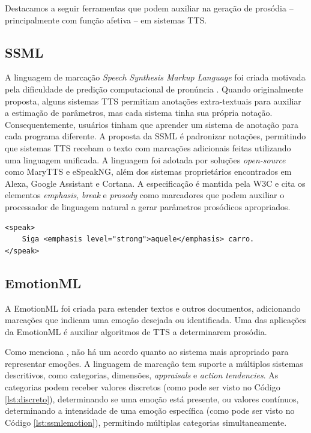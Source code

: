 Destacamos a seguir ferramentas que podem auxiliar na geração de prosódia --
principalmente com função afetiva -- em sistemas TTS.

\subsection{SSML}
A linguagem de marcação \emph{Speech Synthesis Markup Language} foi criada
motivada pela dificuldade de predição computacional de pronúncia
\cite{ssmlpaper}. Quando originalmente proposta, alguns sistemas TTS
permitiam anotações extra-textuais para auxiliar a estimação de parâmetros, mas
cada sistema tinha sua própria notação. Consequentemente, usuários tinham que
aprender um sistema de anotação para cada programa diferente. A proposta da SSML
é padronizar notações, permitindo que sistemas TTS recebam o texto com marcações
adicionais feitas utilizando uma linguagem unificada. A linguagem foi adotada
por soluções \emph{open-source} como MaryTTS e eSpeakNG, além dos sistemas
proprietários encontrados em Alexa, Google Assistant e Cortana. A especificação
é mantida pela W3C \cite{ssml} e cita os elementos \emph{emphasis}, \emph{break}
e \emph{prosody} como marcadores que podem auxiliar o processador de linguagem
natural a gerar parâmetros prosódicos apropriados.

\begin{lstlisting}[caption=Exemplo de texto anotado com SSML]
<speak>
    Siga <emphasis level="strong">aquele</emphasis> carro.
</speak> 
\end{lstlisting}

\subsection{EmotionML}
A EmotionML \cite{emotionml} foi criada para estender textos e outros
documentos, adicionando marcações que indicam uma emoção desejada ou
identificada. Uma das aplicações da EmotionML é auxiliar algoritmos de TTS a
determinarem prosódia.

Como menciona , não há um acordo quanto ao sistema mais
apropriado para representar emoções. A linguagem de marcação tem suporte a
múltiplos sistemas descritivos, como categorias, dimensões, \emph{appraisals} e \emph{action tendencies}. As categorias podem receber valores discretos (como pode ser
visto no Código \ref{lst:discreto}), determinando se uma emoção está presente, ou
valores contínuos, determinando a intensidade de uma emoção específica (como
pode ser visto no Código \ref{lst:ssmlemotion}), permitindo múltiplas categorias
simultaneamente.

